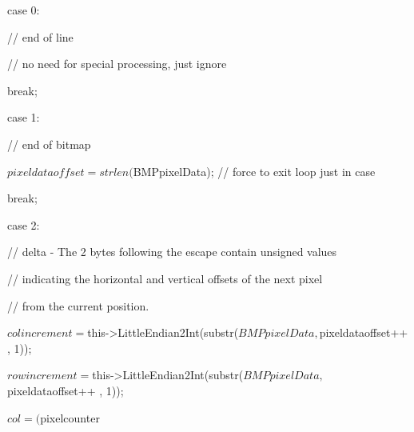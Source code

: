 \begin{DoxyCode}
{{{{      case 0:
                                                                                        
      // end of line
                                                                                        
      // no need for special processing, just ignore
                                                                                        
      break;

                                                                                
      case 1:
                                                                                        
      // end of bitmap
                                                                                        
      $pixeldataoffset = strlen($BMPpixelData); // force to exit loop just in case
                                                                                        
      break;

                                                                                
      case 2:
                                                                                        
      // delta - The 2 bytes following the escape contain unsigned values
                                                                                        
      // indicating the horizontal and vertical offsets of the next pixel
                                                                                        
      // from the current position.
                                                                                        
      $colincrement = $this->LittleEndian2Int(substr($BMPpixelData, $pixeldataoffset++
      , 1));
                                                                                        
      $rowincrement = $this->LittleEndian2Int(substr($BMPpixelData, $pixeldataoffset++
      , 1));
                                                                                        
      $col = ($pixelcounter %
                                                                                        
}}}}
\end{DoxyCode}
